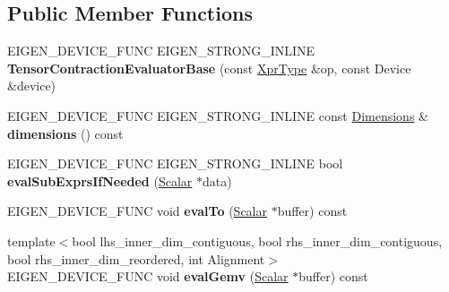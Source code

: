 \subsection*{Public Member Functions}
\begin{DoxyCompactItemize}
\item 
\mbox{\label{struct_eigen_1_1_tensor_contraction_evaluator_base_aa793ab4101a2169bdf623cd8128389f0}} 
E\+I\+G\+E\+N\+\_\+\+D\+E\+V\+I\+C\+E\+\_\+\+F\+U\+NC E\+I\+G\+E\+N\+\_\+\+S\+T\+R\+O\+N\+G\+\_\+\+I\+N\+L\+I\+NE {\bfseries Tensor\+Contraction\+Evaluator\+Base} (const \hyperlink{class_eigen_1_1_tensor_contraction_op}{Xpr\+Type} \&op, const Device \&device)
\item 
\mbox{\label{struct_eigen_1_1_tensor_contraction_evaluator_base_ab2fe84953c8813277d2139d064d2b4a7}} 
E\+I\+G\+E\+N\+\_\+\+D\+E\+V\+I\+C\+E\+\_\+\+F\+U\+NC E\+I\+G\+E\+N\+\_\+\+S\+T\+R\+O\+N\+G\+\_\+\+I\+N\+L\+I\+NE const \hyperlink{struct_eigen_1_1_d_sizes}{Dimensions} \& {\bfseries dimensions} () const
\item 
\mbox{\label{struct_eigen_1_1_tensor_contraction_evaluator_base_a0cc230491ac304c0be1d6e3dd934587f}} 
E\+I\+G\+E\+N\+\_\+\+D\+E\+V\+I\+C\+E\+\_\+\+F\+U\+NC E\+I\+G\+E\+N\+\_\+\+S\+T\+R\+O\+N\+G\+\_\+\+I\+N\+L\+I\+NE bool {\bfseries eval\+Sub\+Exprs\+If\+Needed} (\hyperlink{group___sparse_core___module}{Scalar} $\ast$data)
\item 
\mbox{\label{struct_eigen_1_1_tensor_contraction_evaluator_base_a9ac0a3d010ff6a0b6b2512dfc0ea75aa}} 
E\+I\+G\+E\+N\+\_\+\+D\+E\+V\+I\+C\+E\+\_\+\+F\+U\+NC void {\bfseries eval\+To} (\hyperlink{group___sparse_core___module}{Scalar} $\ast$buffer) const
\item 
\mbox{\label{struct_eigen_1_1_tensor_contraction_evaluator_base_a72cf4fd8e6ba21d8048818993ac8c945}} 
{\footnotesize template$<$bool lhs\+\_\+inner\+\_\+dim\+\_\+contiguous, bool rhs\+\_\+inner\+\_\+dim\+\_\+contiguous, bool rhs\+\_\+inner\+\_\+dim\+\_\+reordered, int Alignment$>$ }\\E\+I\+G\+E\+N\+\_\+\+D\+E\+V\+I\+C\+E\+\_\+\+F\+U\+NC void {\bfseries eval\+Gemv} (\hyperlink{group___sparse_core___module}{Scalar} $\ast$buffer) const

\end{DoxyCompactItemize}
